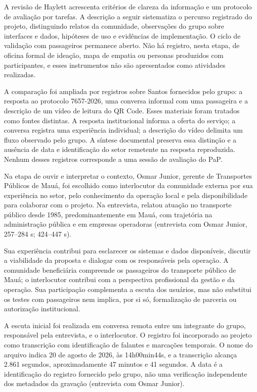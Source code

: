 \documentclass[12pt,oneside,a4paper,brazil,chapter=TITLE]{abntex2}
\begin{document}
A revisão de Haylett acrescenta critérios de clareza da informação e um protocolo de avaliação por tarefas. A descrição a seguir sistematiza o percurso registrado do projeto, distinguindo relatos da comunidade, observações do grupo sobre interfaces e dados, hipóteses de uso e evidências de implementação. O ciclo de validação com passageiros permanece aberto. Não há registro, nesta etapa, de oficina formal de ideação, mapa de empatia ou personas produzidos com participantes, e esses instrumentos não são apresentados como atividades realizadas.

A comparação foi ampliada por registros sobre Santos fornecidos pelo grupo: a resposta ao protocolo 7657-2026, uma conversa informal com uma passageira e a descrição de um vídeo de leitura do QR Code. Esses materiais foram tratados como fontes distintas. A resposta institucional informa a oferta do serviço; a conversa registra uma experiência individual; a descrição do vídeo delimita um fluxo observado pelo grupo. A síntese documental preserva essa distinção e a ausência de data e identificação do setor remetente na resposta reproduzida. Nenhum desses registros corresponde a uma sessão de avaliação do PaP.



\label{sec:escuta-comunidade}
Na etapa de ouvir e interpretar o contexto, Osmar Junior, gerente de Transportes Públicos de Mauá, foi escolhido como interlocutor da comunidade externa por sua experiência no setor, pelo conhecimento da operação local e pela disponibilidade para colaborar com o projeto. Na entrevista, relatou atuação no transporte público desde 1985, predominantemente em Mauá, com trajetória na administração pública e em empresas operadoras  (entrevista com Osmar Junior, 257--284 s; 424--447 s).

Sua experiência contribui para esclarecer os sistemas e dados disponíveis, discutir a viabilidade da proposta e dialogar com os responsáveis pela operação. A comunidade beneficiária compreende os passageiros do transporte público de Mauá; o interlocutor contribui com a perspectiva profissional da gestão e da operação. Sua participação complementa a escuta dos usuários, mas não substitui os testes com passageiros nem implica, por si só, formalização de parceria ou autorização institucional.

A escuta inicial foi realizada em conversa remota entre um integrante do grupo, responsável pela entrevista, e o interlocutor. O registro foi incorporado ao projeto como transcrição com identificação de falantes e marcações temporais. O nome do arquivo indica 20 de agosto de 2026, às 14h00min44s, e a transcrição alcança 2.861 segundos, aproximadamente 47 minutos e 41 segundos. A data é a identificação do registro fornecido pelo grupo, não uma verificação independente dos metadados da gravação  (entrevista com Osmar Junior).
\end{document}
